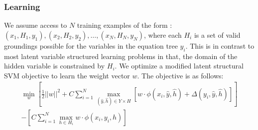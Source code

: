     \subsubsection{Learning}
      We assume access to $N$ training examples of the form : $(x_1,
      H_1, y_1), (x_2, H_2, y_2), \ldots, (x_N, H_N, y_N)$, where each
      $H_i$ is a set of valid groundings possible for the variables in
      the equation tree $y_i$. This is in contrast to most latent
      variable structured learning problems in that, the domain of the
      hidden variable is constrained by $H_i$. We optimize a modified
      latent structural SVM objective to learn the weight vector
      $w$. The objective is as follows:
      \begin{multline}
        \min_w \left[ \frac{1}{2}||w||^2
          + C\sum_{i=1}^N \max_{(\hat{y}, \hat{h})\in Y \times H}
          \left[w\cdot \phi(x_i, \hat{y}, \hat{h}) 
            + \Delta(y_i, \hat{y}, \hat{h}) \right] \right] \\
        - \left[ C\sum_{i=1}^N \max_{h \in H_i} 
          w \cdot \phi(x_i, y_i, h) \right]
      \end{multline}  




    
    





